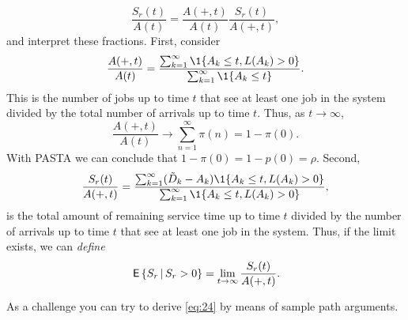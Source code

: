 \begin{question}
\begin{solution}
\begin{equation*}
  \frac{S_r(t)}{A(t)} = 
  \frac{A(+,t)}{A(t)} \frac{S_r(t)}{A(+,t)}, 
\end{equation*}
and interpret these fractions.  First, consider
\begin{equation*}
  \frac{A(+,t)}{A(t)} = 
\frac{\sum_{k=1}^\infty \1{A_k\leq t, L(A_k) > 0}}{\sum_{k=1}^\infty \1{A_k\leq t}}.
\end{equation*}
This is the number of jobs up to time $t$ that see at least one job in
the system divided by the total number of arrivals up to time $t$. Thus, as $t\to\infty$, 
\begin{equation*}
  \frac{A(+,t)}{A(t)} \to \sum_{n=1}^\infty \pi(n) = 1-\pi(0).
\end{equation*}
With PASTA we can conclude that $1-\pi(0) = 1-p(0)= \rho$. Second,
\begin{equation*}
\frac{S_r(t)}{A(+,t)} 
= \frac{\sum_{k=1}^\infty (\tilde D_k - A_k) \1{A_k\leq t, L(A_k) > 0}}{\sum_{k=1}^\infty \1{A_k\leq t, L(A_k)>0}},
\end{equation*}
is the total amount of remaining service time up to time $t$ divided by
the number of arrivals up to time $t$ that see at least one job in the system. Thus, 
if the limit exists, we can \emph{define}
\begin{equation*}
\,\mathsf{E}\left\{S_r \,\middle|\, S_r>0\right\}  =\lim_{t\to\infty} \frac{S_r(t)}{A(+,t)}.
\end{equation*}
  \end{solution}
\end{question}

\begin{question}[use=false]
  As a challenge you can try to derive \eqref{eq:24} by means of sample path arguments.
  \begin{solution}
    \TBD
  \end{solution}
\end{question}



